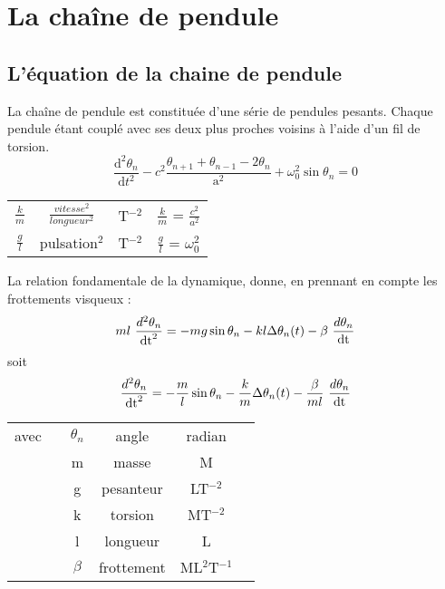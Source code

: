 \section{La chaîne de pendule}
\label{chaineDePendule}
\subsection{L'équation de la chaine de pendule}
La chaîne de pendule est constituée d'une série de pendules pesants. Chaque pendule étant couplé avec ses deux plus proches voisins à l'aide d'un fil de torsion.\cite{sine-gordon}\cite{chaine-pendule}
\[
\frac{\mathrm d^2\theta _n}{\mathrm d t^2} - c^2 \frac{\theta _{n+1} + \theta _{n-1} - 2 \theta _n}{\mathrm{a} ^2} + \omega _0 ^2 \sin \theta _n = 0
\]
%
\begin{center}
\begin{tabular}{cccc}
$\frac{k}{m}$ & $\frac{vitesse^2}{longueur^2}$ & T$^{-2}$ & $\frac{k}{m}$ = $\frac{c^2}{a^2}$ \\
$\frac{g}{l}$& pulsation$^2$ & T$^{-2}$ & $\frac{g}{l}$ = $\omega _0 ^2$ \\
\end{tabular}
\end{center}

La relation fondamentale de la dynamique, donne, en prennant en compte les frottements visqueux :
\[
m l\ \frac{d^2 \theta _n}{\dt^2} =  - m g \sin{\theta _n}  -  k l \Delta \theta _n(t)  -  \beta\ \frac{d \theta _n}{\dt}
\]
soit
\[
\frac{d^2 \theta _n}{\dt^2} =  - \frac{m}{l} \sin{\theta _n}  -  \frac{k}{m} \Delta \theta _n(t)  - \frac{\beta}{ml}\ \frac{d \theta _n}{\dt}
\]
\begin{center}
\begin{tabular}{cccccc}
avec & & $\theta _n$ & angle & radian &  \\
 & & m & masse & M &  \\
 & & g & pesanteur & LT$^{-2}$ &  \\
 & & k & torsion & MT$^{-2}$ &  \\
 & & l & longueur & L &  \\
 & & $\beta$ & frottement & ML$^{2}$T$^{-1}$ &  \\
\end{tabular}
\end{center}
%
